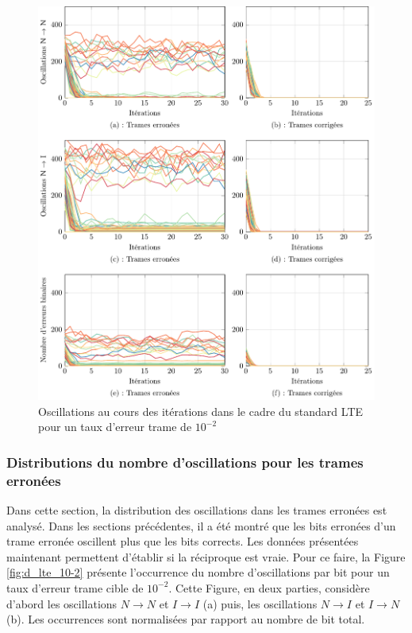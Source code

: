 \begin{figure}[!hb]
	\hspace*{-.7cm}
	\includegraphics[]{main/ch2_fig/tikz/it_lte10-5.pdf}
	\caption{Oscillations au cours des itérations dans le cadre du standard LTE pour un taux d'erreur trame de $10^{-2}$ 
	\label{ch2:fig:it_lte_2}}
\end{figure}

\subsubsection{Distributions du nombre d'oscillations pour les trames erronées} 
Dans cette section, la distribution des oscillations dans les trames erronées est analysé. Dans les sections précédentes,
il a été montré que les bits erronées d'un trame erronée oscillent plus que les bits corrects. Les données présentées 
maintenant permettent d'établir si la réciproque est vraie. 
Pour ce faire, la Figure \ref{fig:d_lte_10-2} présente l’occurrence du nombre d'oscillations par bit pour un taux 
d'erreur trame cible de $10^{-2}$. Cette Figure, en deux parties, considère d'abord les oscillations $N\rightarrow N$ et 
$I\rightarrow I$ (a) puis, les oscillations $N\rightarrow I$ et $I\rightarrow N$ (b). Les occurrences sont normalisées 
par rapport au nombre de bit total.

